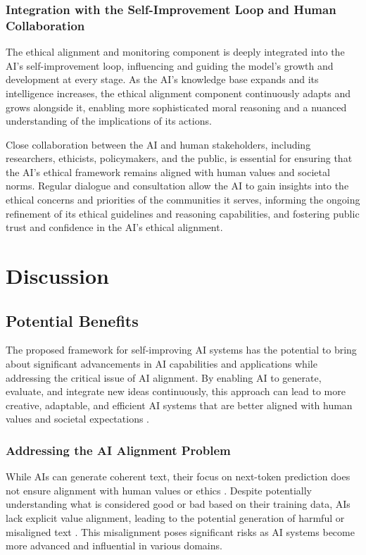 \documentclass[conference]{article}
\begin{document}
	\subsubsection{Integration with the Self-Improvement Loop and Human Collaboration}
	The ethical alignment and monitoring component is deeply integrated into the AI's self-improvement loop, influencing and guiding the model's growth and development at every stage. As the AI's knowledge base expands and its intelligence increases, the ethical alignment component continuously adapts and grows alongside it, enabling more sophisticated moral reasoning and a nuanced understanding of the implications of its actions.
	
	Close collaboration between the AI and human stakeholders, including researchers, ethicists, policymakers, and the public, is essential for ensuring that the AI's ethical framework remains aligned with human values and societal norms. Regular dialogue and consultation allow the AI to gain insights into the ethical concerns and priorities of the communities it serves, informing the ongoing refinement of its ethical guidelines and reasoning capabilities, and fostering public trust and confidence in the AI's ethical alignment.
	
	\section{Discussion}
	
	\subsection{Potential Benefits}
	The proposed framework for self-improving AI systems has the potential to bring about significant advancements in AI capabilities and applications while addressing the critical issue of AI alignment. By enabling AI to generate, evaluate, and integrate new ideas continuously, this approach can lead to more creative, adaptable, and efficient AI systems that are better aligned with human values and societal expectations \cite{lake2017building}.
	
	\subsubsection{Addressing the AI Alignment Problem}
	While AIs can generate coherent text, their focus on next-token prediction does not ensure alignment with human values or ethics \cite{radford2019language}. Despite potentially understanding what is considered good or bad based on their training data, AIs lack explicit value alignment, leading to the potential generation of harmful or misaligned text \cite{bostrom2017superintelligence, russell2019human}. This misalignment poses significant risks as AI systems become more advanced and influential in various domains.
	
\end{document}
